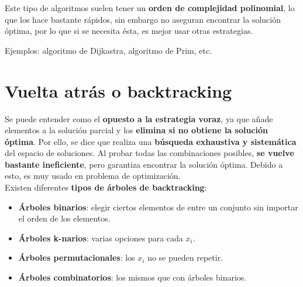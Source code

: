 \documentclass{article}
\begin{document}
Este tipo de algoritmos suelen tener un \textbf{orden de complejidad polinomial}, lo que los
hace bastante rápidos, sin embargo no aseguran encontrar la solución óptima, por lo que si se
necesita ésta, es mejor usar otras estrategias.

Ejemplos: algoritmo de Dijkastra, algoritmo de Prim, etc.

\newpage

\section{Vuelta atrás o backtracking}
Se puede entender como el \textbf{opuesto a la estrategia voraz}, ya que añade elementos a la
solución parcial y los \textbf{elimina si no obtiene la solución óptima}. Por ello, se dice que realiza una \textbf{búsqueda exhaustiva y sistemática} del espacio de soluciones. Al probar todas las
combinaciones posibles, \textbf{se vuelve bastante ineficiente}, pero garantiza encontrar la solución
óptima. Debido a esto, es muy usado en problema de optimización. \\

Existen diferentes \textbf{tipos de árboles de backtracking}:
\begin{itemize}
    \item \textbf{Árboles binarios}: elegir ciertos elementos de entre un conjunto sin importar el orden de los elementos.
    \item \textbf{Árboles k-narios}: varias opciones para cada $x_i$.
    \item \textbf{Árboles permutacionales}: los $x_i$ no se pueden repetir.
    \item \textbf{Árboles combinatorios}: los mismos que con árboles binarios.
\end{itemize}
\end{document}
